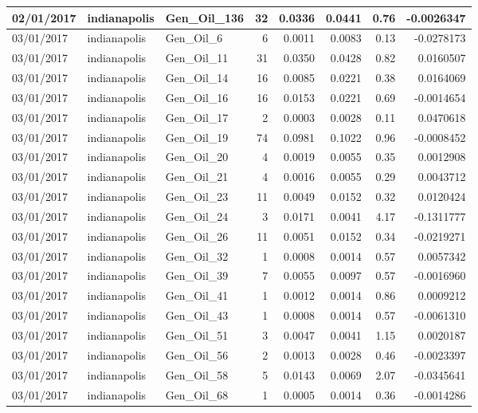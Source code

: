 \documentclass[
  letterpaper,
  DIV=11,
  numbers=noendperiod]{scrartcl}
\begin{document}
\begin{tabular}{l|l|l|r|r|r|r|r}
\hline
02/01/2017 & indianapolis & Gen\_Oil\_136 & 32 & 0.0336 & 0.0441 & 0.76 & -0.0026347\\
\hline
03/01/2017 & indianapolis & Gen\_Oil\_6 & 6 & 0.0011 & 0.0083 & 0.13 & -0.0278173\\
\hline
03/01/2017 & indianapolis & Gen\_Oil\_11 & 31 & 0.0350 & 0.0428 & 0.82 & 0.0160507\\
\hline
03/01/2017 & indianapolis & Gen\_Oil\_14 & 16 & 0.0085 & 0.0221 & 0.38 & 0.0164069\\
\hline
03/01/2017 & indianapolis & Gen\_Oil\_16 & 16 & 0.0153 & 0.0221 & 0.69 & -0.0014654\\
\hline
03/01/2017 & indianapolis & Gen\_Oil\_17 & 2 & 0.0003 & 0.0028 & 0.11 & 0.0470618\\
\hline
03/01/2017 & indianapolis & Gen\_Oil\_19 & 74 & 0.0981 & 0.1022 & 0.96 & -0.0008452\\
\hline
03/01/2017 & indianapolis & Gen\_Oil\_20 & 4 & 0.0019 & 0.0055 & 0.35 & 0.0012908\\
\hline
03/01/2017 & indianapolis & Gen\_Oil\_21 & 4 & 0.0016 & 0.0055 & 0.29 & 0.0043712\\
\hline
03/01/2017 & indianapolis & Gen\_Oil\_23 & 11 & 0.0049 & 0.0152 & 0.32 & 0.0120424\\
\hline
03/01/2017 & indianapolis & Gen\_Oil\_24 & 3 & 0.0171 & 0.0041 & 4.17 & -0.1311777\\
\hline
03/01/2017 & indianapolis & Gen\_Oil\_26 & 11 & 0.0051 & 0.0152 & 0.34 & -0.0219271\\
\hline
03/01/2017 & indianapolis & Gen\_Oil\_32 & 1 & 0.0008 & 0.0014 & 0.57 & 0.0057342\\
\hline
03/01/2017 & indianapolis & Gen\_Oil\_39 & 7 & 0.0055 & 0.0097 & 0.57 & -0.0016960\\
\hline
03/01/2017 & indianapolis & Gen\_Oil\_41 & 1 & 0.0012 & 0.0014 & 0.86 & 0.0009212\\
\hline
03/01/2017 & indianapolis & Gen\_Oil\_43 & 1 & 0.0008 & 0.0014 & 0.57 & -0.0061310\\
\hline
03/01/2017 & indianapolis & Gen\_Oil\_51 & 3 & 0.0047 & 0.0041 & 1.15 & 0.0020187\\
\hline
03/01/2017 & indianapolis & Gen\_Oil\_56 & 2 & 0.0013 & 0.0028 & 0.46 & -0.0023397\\
\hline
03/01/2017 & indianapolis & Gen\_Oil\_58 & 5 & 0.0143 & 0.0069 & 2.07 & -0.0345641\\
\hline
03/01/2017 & indianapolis & Gen\_Oil\_68 & 1 & 0.0005 & 0.0014 & 0.36 & -0.0014286\\

\end{tabular}
\end{document}
